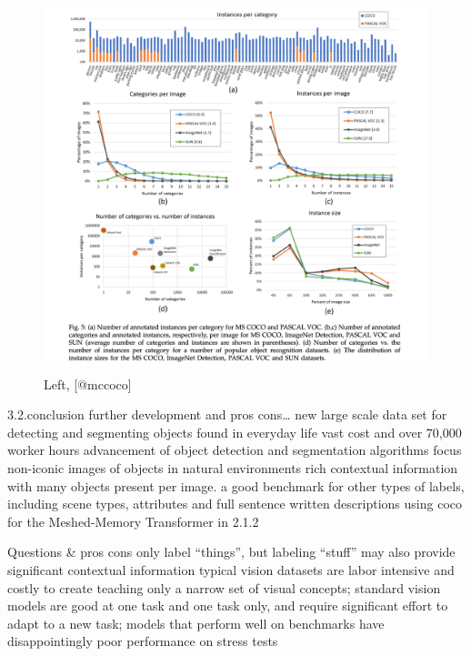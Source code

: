\documentclass[
]{krantz}
\begin{document}
\begin{figure}

{\centering \includegraphics[width=1\linewidth]{figures/02-chapter2/2.1 coco cmparison} 

}

\caption{Left, [@mccoco]}\label{fig:unnamed-chunk-3}
\end{figure}

3.2.conclusion further development and pros cons\ldots{}
new large scale data set for detecting and segmenting objects found in everyday life
vast cost and over 70,000 worker hours
advancement of object detection and segmentation algorithms
focus non-iconic images of objects in natural environments
rich contextual information with many objects present per image.
a good benchmark for other types of labels, including scene types, attributes and full sentence written descriptions
using coco for the Meshed-Memory Transformer in 2.1.2

Questions \& pros cons
only label ``things'', but labeling ``stuff'' may also provide significant contextual information
typical vision datasets are labor intensive and costly to create
teaching only a narrow set of visual concepts;
standard vision models are good at one task and one task only, and require significant effort to adapt to a new task;
models that perform well on benchmarks have disappointingly poor performance on stress tests
\end{document}

